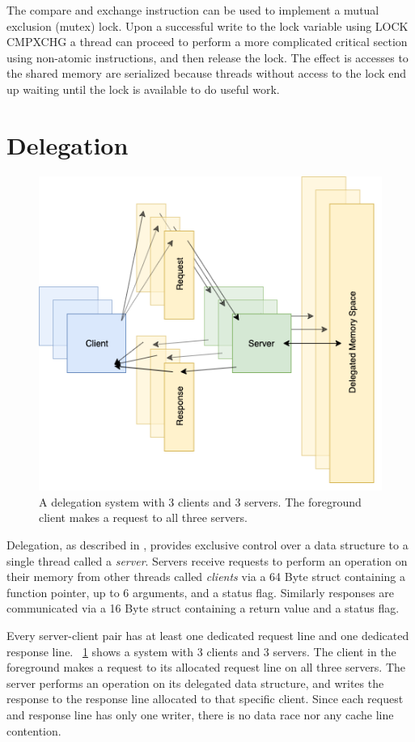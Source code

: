 \documentclass{uicthesi}
\begin{document}
The compare and exchange instruction can be used to implement a mutual exclusion (mutex) lock. Upon a successful write to the lock variable using LOCK CMPXCHG a thread can proceed to perform a more complicated critical section using non-atomic instructions, and then release the lock. The effect is accesses to the shared memory are serialized because threads without access to the lock end up waiting until the lock is available to do useful work. 

\section{Delegation}
\begin{figure}[ht!]
\centering
\includegraphics[width=0.9\columnwidth]{FIG/general_delegation.png}
\caption{A delegation system with 3 clients and 3 servers. The foreground client makes a request to all three servers. }
\label{fig:general_delegation}
\end{figure}
Delegation, as described in \cite{ffwd}, provides exclusive control over a data structure to a single thread called a \textit{server}. Servers receive requests to perform an operation on their memory from other threads called \textit{clients} via a 64 Byte struct containing a function pointer, up to 6 arguments, and a status flag. Similarly responses are communicated via a 16 Byte struct containing a return value and a status flag.  

Every server-client pair has at least one dedicated request line and one dedicated response line. ~\ref{fig:general_delegation} shows a system with 3 clients and 3 servers. The client in the foreground makes a request to its allocated request line on all three servers. The server performs an operation on its delegated data structure, and writes the response to the response line allocated to that specific client. Since each request and response line has only one writer, there is no data race nor any cache line contention. 
\end{document}

